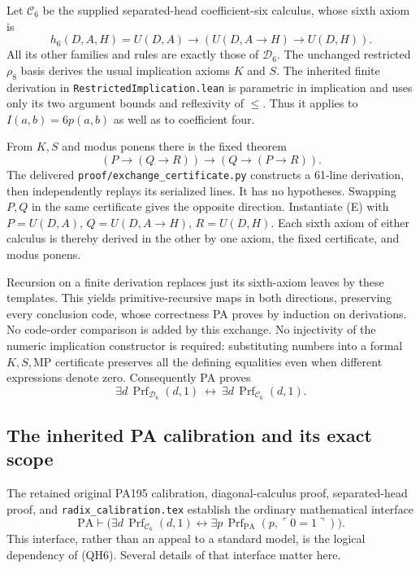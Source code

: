 Let $\mathcal C_6$ be the supplied separated-head coefficient-six calculus,
whose sixth axiom is
\[
 h_6(D,A,H)=U(D,A)\to(U(D,A\to H)\to U(D,H)).
\]
All its other families and rules are exactly those of $\mathcal D_6$.
The unchanged restricted $\rho_8$ basis derives the usual implication
axioms $K$ and $S$. The inherited finite derivation in
\texttt{RestrictedImplication.lean} is parametric in implication and uses
only its two argument bounds and reflexivity of $\leq$. Thus it applies
to $I(a,b)=6p(a,b)$ as well as to coefficient four.

From $K,S$ and modus ponens there is the fixed theorem
\[
 (P\to(Q\to R))\to(Q\to(P\to R)).               \tag{E}
\]
The delivered \texttt{proof/exchange\_certificate.py} constructs a
61-line derivation, then independently replays its serialized lines.
It has no hypotheses. Swapping $P,Q$ in the same certificate gives the
opposite direction. Instantiate (E) with
$P=U(D,A)$, $Q=U(D,A\to H)$, $R=U(D,H)$. Each sixth axiom of either
calculus is thereby derived in the other by one axiom, the fixed
certificate, and modus ponens.

Recursion on a finite derivation replaces just its sixth-axiom leaves
by these templates. This yields primitive-recursive maps in both
directions, preserving every conclusion code, whose correctness PA
proves by induction on derivations. No code-order comparison is added
by this exchange. No injectivity of the numeric implication constructor
is required: substituting numbers into a formal $K,S,\mathrm{MP}$
certificate preserves all the defining equalities even when different
expressions denote zero. Consequently PA proves
\[
 \exists d\,\operatorname{Prf}_{\mathcal D_6}(d,1)
 \ \leftrightarrow\
 \exists d\,\operatorname{Prf}_{\mathcal C_6}(d,1).       \tag{1}
\]

\subsection{The inherited PA calibration and its exact scope}

The retained original PA195 calibration, diagonal-calculus proof,
separated-head proof, and \texttt{radix\_calibration.tex} establish the
ordinary mathematical interface
\[
 \mathrm{PA}\vdash
 \bigl(\exists d\,\operatorname{Prf}_{\mathcal C_6}(d,1)
 \leftrightarrow
 \exists p\,\operatorname{Prf}_{\mathrm{PA}}(p,\ulcorner0=1\urcorner)
 \bigr).                                                \tag{2}
\]
This interface, rather than an appeal to a standard model, is the logical
dependency of (QH6). Several details of that interface matter here.

